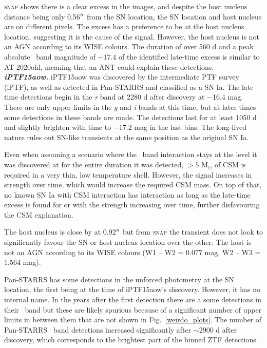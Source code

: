 \documentclass[a4paper,oneside,12pt, class=Latex/Classes/PhDthesisPSnPDF, crop=false]{standalone}
\begin{document}
\textsc{snap} shows there is a clear excess in the images, and despite the host nucleus distance being only 0.56$^{\prime\prime}$ from the SN location, the SN location and host nucleus are on different pixels. The excess has a preference to be at the host nucleus location, suggesting it is the cause of the signal. However, the host nucleus is not an AGN according to its WISE colours. The duration of over 560 d and a peak absolute \ztfr\ band magnitude of $-17.4$ of the identified late-time excess is similar to AT 2020ohl, meaning that an ANT could explain these detections.\\


\textit{\textbf{iPTF15aow.}}
iPTF15aow was discovered by the intermediate PTF survey (iPTF), as well as detected in Pan-STARRS and classified as a SN Ia. The late-time detections begin in the \textit{r} band at 2280 d after discovery at $-$16.4 mag. There are only upper limits in the \textit{g} and \textit{i} bands at this time, but at later times some detections in these bands are made. The detections last for at least 1050 d and slightly brighten with time to $-$17.2 mag in the last bins. The long-lived nature rules out SN-like transients at the same position as the original SN Ia. 

Even when assuming a scenario where the \ztfr\ band interaction stays at the level it was discovered at for the entire duration it was detected, $> 5$ M$_\odot$ of CSM is required in a very thin, low temperature shell. However, the signal increases in strength over time, which would increase the required CSM mass. On top of that, no known SN Ia with CSM interaction has interaction as long as the late-time excess is found for or with the strength increasing over time, further disfavouring the CSM explanation.

The host nucleus is close by at 0.92$^{\prime\prime}$ but from \textsc{snap} the transient does not look to significantly favour the SN or host nucleus location over the other. The host is not an AGN according to its WISE colours (W1 -- W2 = 0.077 mag, W2 -- W3 = 1.564 mag). 

Pan-STARRS has some detections in the unforced photometry at the SN location, the first being at the time of iPTF15aow's discovery. However, it has no internal name. In the years after the first detection there are a some detections in their \ztfi\ band but these are likely spurious because of a significant number of upper limits in between them that are not shown in Fig.~\ref{weirdo_plots}. The number of Pan-STARRS \ztfi\ band detections increased significantly after $\sim$2900 d after discovery, which corresponds to the brightest part of the binned ZTF detections.
\end{document}

